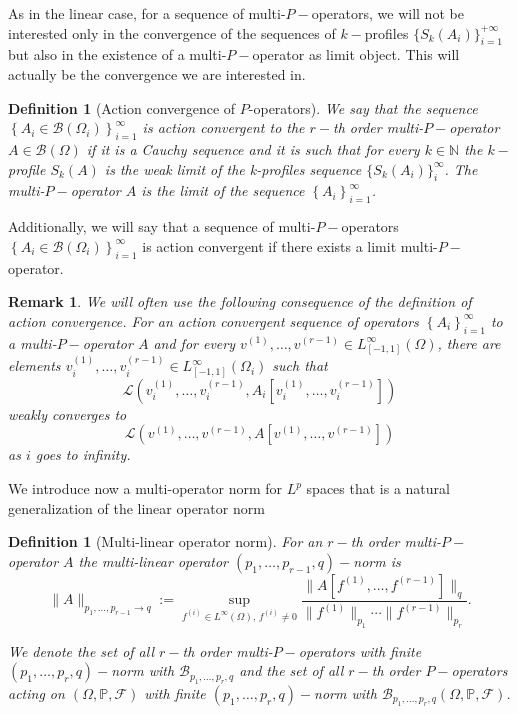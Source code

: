 \documentclass[11pt]{article}
\newtheorem{definition}[theorem]{Definition}
\newtheorem{remark}[theorem]{Remark}
\def\N{\mathbb{N}}
\def\P{\mathbb{P}}
\begin{document}
As in the linear case, for a sequence of multi-$P-$operators, we will not be interested only in the convergence of the sequences of $k-$profiles $\{S_k(A_i)\}^{+\infty}_{i=1}$ but also in the existence of a multi-$P-$operator as limit object. This will actually be the convergence we are interested in.

\begin{definition}[Action convergence of $P$-operators] 
We say that the sequence  $\left\{A_i \in \mathcal{B}\left(\Omega_i\right)\right\}_{i=1}^{\infty}$ is \emph{action convergent}  to the $r-$th order multi-$P-$operator $A\in\mathcal{B}\left(\Omega\right)$  if it is a Cauchy sequence and it is such that for every $k\in \N$ the $k-$profile $S_k(A)$ is the weak limit of the k-profiles sequence $\{S_k(A_i)\}^{\infty}_{i}$. The multi-$P-$operator $A$ is the limit of the sequence  $\left\{A_i \right\}_{i=1}^{\infty}$.
\end{definition}
Additionally, we will say that a sequence of multi-$P-$operators $\left\{A_i \in \mathcal{B}\left(\Omega_i\right)\right\}_{i=1}^{\infty}$ is action convergent if there exists a limit multi-$P-$operator.

 \begin{remark}
 We will often use the following consequence of the definition of action convergence. For an action convergent sequence of operators $\left\{A_i\right\}_{i=1}^{\infty}$ to a multi-$P-$operator $A$ and for every $v^{(1)},\ldots, v^{(r-1)}\in L_{[-1,1]}^{\infty}(\Omega)$, there are elements $v^{(1)}_i,\ldots, v^{(r-1)}_i \in L_{[-1,1]}^{\infty}\left(\Omega_i\right)$ such that $$\mathcal{L}\left(v^{(1)}_i,\ldots, v^{(r-1)}_i,A_i[v^{(1)}_i,\ldots, v^{(r-1)}_i]\right)$$ weakly converges to $$\mathcal{L}(v^{(1)},\ldots, v^{(r-1)},A[v^{(1)},\ldots, v^{(r-1)}])$$ as $i$ goes to infinity.
 \end{remark}

We introduce now a multi-operator norm for $L^p$ spaces that is a natural generalization of the linear operator norm
\begin{definition}[Multi-linear operator norm]
For an $r-$th order multi-$P-$operator $A$ %
the multi-linear operator $(p_1,\ldots,p_{r-1},q)-$norm is 
\begin{equation*}
\|A\|_{p_1,\ldots,p_{r-1}\rightarrow q}:=\sup_{f^{(i)}\in L^{\infty}(\Omega), \, f^{(i)}\neq 0}\frac{\|A[f^{(1)},\ldots,f^{(r-1)}]\|_{q}}{\|f^{(1)}\|_{ p_1}\cdots\|f^{(r-1)}\|_{ p_r}}.
\end{equation*}

We denote the set of all $r-$th order multi-$P-$operators with finite $(p_1,\ldots,p_{r},q)-$norm with $\mathcal{B}_{p_1,\ldots,p_r,q}$ and the set of all $r-$th order $P-$operators acting on $(\Omega, \P,\mathcal{F})$ with finite $(p_1,\ldots,p_{r},q)-$norm with $\mathcal{B}_{p_1,\ldots,p_r,q}(\Omega, \P,\mathcal{F})$.
\end{definition}
\end{document}
